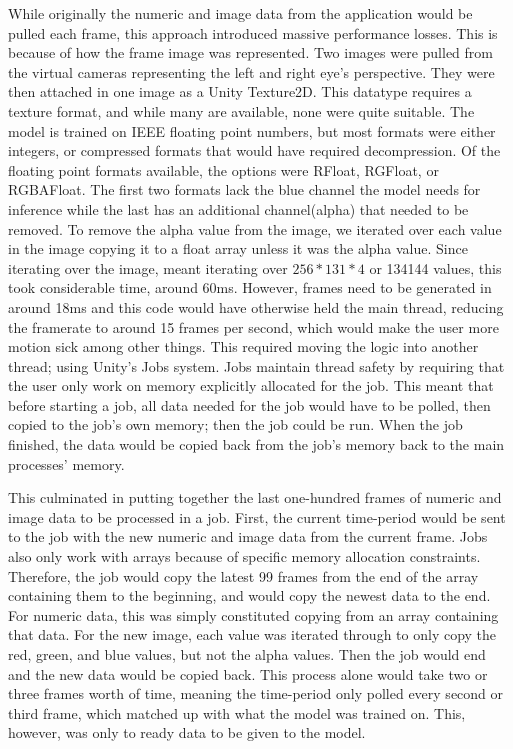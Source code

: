 While originally the numeric and image data from the application would be pulled each frame, this approach introduced massive performance losses.
This is because of how the frame image was represented.
Two images were pulled from the virtual cameras representing the left and right eye's perspective.
They were then attached in one image as a Unity Texture2D\@.
This datatype requires a texture format, and while many are available, none were quite suitable.
The model is trained on IEEE floating point numbers, but most formats were either integers, or compressed formats that would have required decompression.
Of the floating point formats available, the options were RFloat, RGFloat, or RGBAFloat.
The first two formats lack the blue channel the model needs for inference while the last has an additional channel(alpha) that needed to be removed.
To remove the alpha value from the image, we iterated over each value in the image copying it to a float array unless it was the alpha value.
Since iterating over the image, meant iterating over $256*131*4$ or 134144 values, this took considerable time, around 60ms.
However, frames need to be generated in around 18ms and this code would have otherwise held the main thread, reducing the framerate to around 15 frames per second, which would make the user more motion sick among other things.
This required moving the logic into another thread; using Unity's Jobs system.
Jobs maintain thread safety by requiring that the user only work on memory explicitly allocated for the job.
This meant that before starting a job, all data needed for the job would have to be polled, then copied to the job's own memory; then the job could be run.
When the job finished, the data would be copied back from the job's memory back to the main processes' memory.

This culminated in putting together the last one-hundred frames of numeric and image data to be processed in a job.
First, the current time-period would be sent to the job with the new numeric and image data from the current frame.
Jobs also only work with arrays because of specific memory allocation constraints.
Therefore, the job would copy the latest 99 frames from the end of the array containing them to the beginning, and would copy the newest data to the end.
For numeric data, this was simply constituted copying from an array containing that data.
For the new image, each value was iterated through to only copy the red, green, and blue values, but not the alpha values.
Then the job would end and the new data would be copied back.
This process alone would take two or three frames worth of time, meaning the time-period only polled every second or third frame, which matched up with what the model was trained on.
This, however, was only to ready data to be given to the model.

